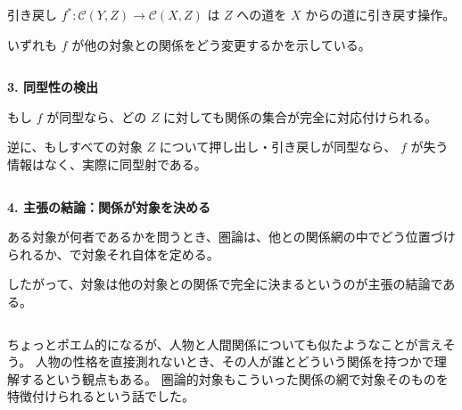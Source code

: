 \documentclass[uplatex,a4j,12pt,dvipdfmx]{jsarticle}
\begin{document}
引き戻し $f^{*} :\mathcal{C}(Y,Z) \to \mathcal{C}(X,Z)$ は
$Z$ への道を $X$ からの道に引き戻す操作。

いずれも $f$ が他の対象との関係をどう変更するかを示している。

${}$

{\bf 3. 同型性の検出}

もし $f$ が同型なら、どの $Z$ に対しても関係の集合が完全に対応付けられる。

逆に、もしすべての対象 $Z$ について押し出し・引き戻しが同型なら、 $f$ が失う情報はなく、実際に同型射である。

${}$

{\bf 4. 主張の結論：関係が対象を決める}

ある対象が何者であるかを問うとき、圏論は、他との関係網の中でどう位置づけられるか、で対象それ自体を定める。

したがって、対象は他の対象との関係で完全に決まるというのが主張の結論である。

${}$

ちょっとポエム的になるが、人物と人間関係についても似たようなことが言えそう。
人物の性格を直接測れないとき、その人が誰とどういう関係を持つかで理解するという観点もある。
圏論的対象もこういった関係の網で対象そのものを特徴付けられるという話でした。
\end{document}
